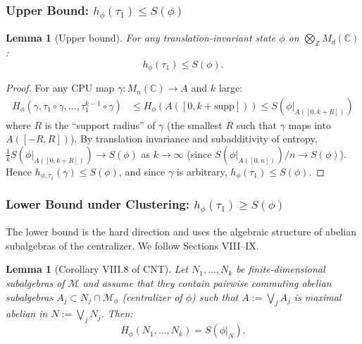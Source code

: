 \documentclass[12pt,a4paper]{article}
\newtheorem{lemma}[theorem]{Lemma}
\newcommand{\CC}{\mathbb{C}}
\newcommand{\ZZ}{\mathbb{Z}}
\newcommand{\Mn}{M_n(\CC)}
\newcommand{\Md}{M_d(\CC)}
\newcommand{\vN}{\mathcal{M}}      %
\newcommand{\Hphi}{H_{\phi}}
\begin{document}
\subsubsection{Upper Bound: $h_\phi(\tau_1)\le S(\phi)$}

\begin{lemma}[Upper bound]\label{lem:upper_bound}
For any translation-invariant state $\phi$ on $\bigotimes_\ZZ\Md$:
\begin{equation}\label{eq:upper_bound}
  h_\phi(\tau_1) \le S(\phi).
\end{equation}
\end{lemma}

\begin{proof}
For any CPU map $\gamma:\Mn\to A$ and $k$ large:
\begin{align*}
  \Hphi(\gamma,\tau_1\circ\gamma,\ldots,\tau_1^{k-1}\circ\gamma)
  &\le \Hphi(A([0,k+\mathrm{supp}]))
  \le S(\phi|_{A([0,k+R])})
\end{align*}
where $R$ is the ``support radius'' of $\gamma$ (the smallest $R$ such that $\gamma$
maps into $A([-R,R])$).  By translation invariance and subadditivity of entropy,
$\frac{1}{k}S(\phi|_{A([0,k+R])})\to S(\phi)$ as $k\to\infty$ (since
$S(\phi|_{A([0,n])})/n\to S(\phi)$).  Hence
$h_{\phi,\tau_1}(\gamma)\le S(\phi)$, and since $\gamma$ is arbitrary,
$h_\phi(\tau_1)\le S(\phi)$.
\end{proof}

\subsubsection{Lower Bound under Clustering: $h_\phi(\tau_1)\ge S(\phi)$}

The lower bound is the hard direction and uses the algebraic structure of
abelian subalgebras of the centralizer.  We follow \cite{cnt87} Sections VIII--IX.

\begin{lemma}[Corollary VIII.8 of CNT]\label{lem:abelian_subalg}
Let $N_1,\ldots,N_k$ be finite-dimensional subalgebras of $\vN$ and assume that
they contain pairwise commuting abelian subalgebras $A_j\subset N_j\cap\vN_\phi$
(centralizer of $\phi$) such that $A:=\bigvee_j A_j$ is maximal abelian in
$N:=\bigvee_j N_j$.  Then:
\begin{equation}\label{eq:abelian_subalg}
  \Hphi(N_1,\ldots,N_k) = S(\phi|_N).
\end{equation}
\end{lemma}
\end{document}
